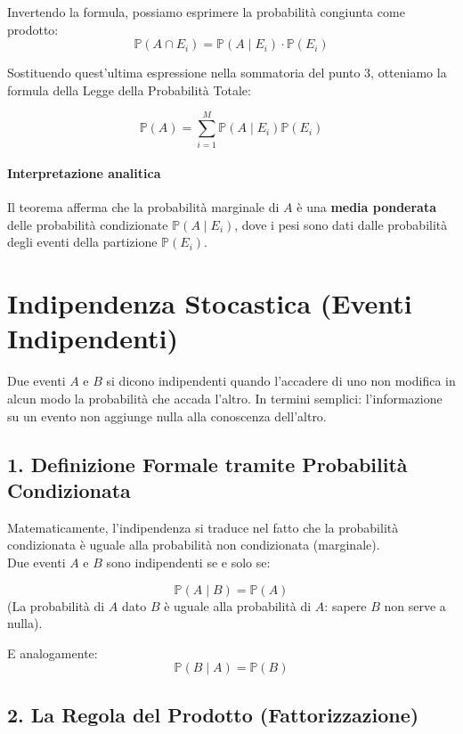 Invertendo la formula, possiamo esprimere la probabilità congiunta come prodotto:
\[ \mathbb{P}(A \cap E_i) = \mathbb{P}(A \mid E_i) \cdot \mathbb{P}(E_i) \]

Sostituendo quest'ultima espressione nella sommatoria del punto 3, otteniamo la formula della Legge della Probabilità Totale:

\begin{equation}
\boxed{\mathbb{P}(A) = \sum_{i=1}^M \mathbb{P}(A \mid E_i)\mathbb{P}(E_i)}
\end{equation}

\paragraph{Interpretazione analitica}
Il teorema afferma che la probabilità marginale di $A$ è una \textbf{media ponderata} delle probabilità condizionate $\mathbb{P}(A \mid E_i)$, dove i pesi sono dati dalle probabilità degli eventi della partizione $\mathbb{P}(E_i)$.

\section{Indipendenza Stocastica (Eventi Indipendenti)}

Due eventi $A$ e $B$ si dicono indipendenti quando l'accadere di uno non modifica in alcun modo la probabilità che accada l'altro. In termini semplici: l'informazione su un evento non aggiunge nulla alla conoscenza dell'altro.

\subsection{1. Definizione Formale tramite Probabilità Condizionata}

Matematicamente, l'indipendenza si traduce nel fatto che la probabilità condizionata è uguale alla probabilità non condizionata (marginale).
\\Due eventi $A$ e $B$ sono indipendenti se e solo se:

\[
\mathbb{P}(A \mid B) = \mathbb{P}(A)
\]
(La probabilità di $A$ dato $B$ è uguale alla probabilità di $A$: sapere $B$ non serve a nulla).

E analogamente:
\[
\mathbb{P}(B \mid A) = \mathbb{P}(B)
\]

\subsection{2. La Regola del Prodotto (Fattorizzazione)}

